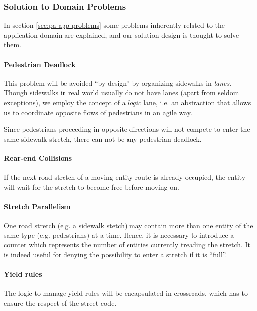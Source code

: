 \subsubsection{Solution to Domain Problems}

In section \ref{sec:pa-app-problems} some problems 
inherently related to the application domain are explained, 
and our solution design is thought to solve them.

\paragraph{Pedestrian Deadlock}
This problem will be avoided ``by design'' by organizing sidewalks in
\textit{lanes}. Though sidewalks in real world usually do not have lanes (apart
from seldom exceptions), we employ the concept of a \textit{logic} lane, i.e.
an abstraction that allows us to coordinate opposite flows of pedestrians in an
agile way.

Since pedestrians proceeding in opposite directions will not compete to enter
the same sidewalk stretch, there can not be any pedestrian deadlock.

\paragraph{Rear-end Collisions} 
If the next road stretch of a moving entity route is already occupied,
the entity will wait for the stretch to become free before moving on.

\paragraph{Stretch Parallelism} 
One road stretch (e.g. a sidewalk stetch) may contain more 
than one entity of the same type (e.g. pedestrians) at a time.
Hence, it is necessary to introduce a counter which represents
the number of entities currently treading the stretch.
It is indeed useful for denying the possibility to enter a stretch if it is ``full''.

\paragraph{Yield rules} 
The logic to manage yield rules will be encapsulated in crossroads, 
which has to ensure the respect of the street code.
